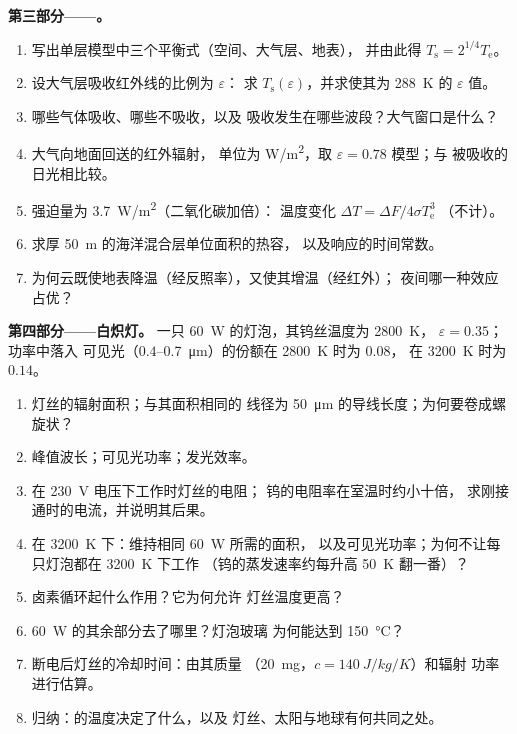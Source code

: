 \begin{problem}
\textbf{第三部分——。}
\begin{enumerate}[resume]
  \item 写出单层模型中三个平衡式（空间、大气层、地表），
        并由此得 $T_{\text{s}} = 2^{1/4}T_{\text{e}}$。
  \item 设大气层吸收红外线的比例为 $\varepsilon$：
        求 $T_{\text{s}}(\varepsilon)$，并求使其为
        \qty{288}{K} 的 $\varepsilon$ 值。
  \item 哪些气体吸收、哪些不吸收，以及
        吸收发生在哪些波段？大气窗口是什么？
  \item 大气向地面回送的红外辐射，
        单位为 \unit{W/m^2}，取 $\varepsilon = 0.78$ 模型；与
        被吸收的日光相比较。
  \item 强迫量为 \qty{3.7}{W/m^2}（二氧化碳加倍）：
        温度变化 $\Delta T = \Delta F/4\sigma T_{\text{e}}^3$
        （不计）。
  \item 求厚 \qty{50}{m} 的海洋混合层单位面积的热容，
        以及响应的时间常数。
  \item 为何云既使地表降温（经反照率），又使其增温（经红外）；
        夜间哪一种效应占优？
\end{enumerate}

\textbf{第四部分——白炽灯。}
一只 \qty{60}{W} 的灯泡，其钨丝温度为 \qty{2800}{K}，
$\varepsilon = 0.35$；功率中落入
可见光（$0.4$--\qty{0.7}{\micro m}）的份额在 \qty{2800}{K} 时为 $0.08$，
在 \qty{3200}{K} 时为 $0.14$。
\begin{enumerate}[resume]
  \item 灯丝的辐射面积；与其面积相同的
        线径为 \qty{50}{\micro m} 的导线长度；为何要卷成螺旋状？
  \item 峰值波长；可见光功率；发光效率。
  \item 在 \qty{230}{V} 电压下工作时灯丝的电阻；
        钨的电阻率在室温时约小十倍，
        求刚接通时的电流，并说明其后果。
  \item 在 \qty{3200}{K} 下：维持相同 \qty{60}{W} 所需的面积，
        以及可见光功率；为何不让每只灯泡都在 \qty{3200}{K} 下工作
        （钨的蒸发速率约每升高
        \qty{50}{K} 翻一番）？
  \item 卤素循环起什么作用？它为何允许
        灯丝温度更高？
  \item \qty{60}{W} 的其余部分去了哪里？灯泡玻璃
        为何能达到 \qty{150}{\celsius}？
  \item 断电后灯丝的冷却时间：由其质量
        （\qty{20}{mg}，$c = \qty{140}{J/kg/K}$）和辐射
        功率进行估算。
  \item 归纳：的温度决定了什么，以及
        灯丝、太阳与地球有何共同之处。
\end{enumerate}
\end{problem}
